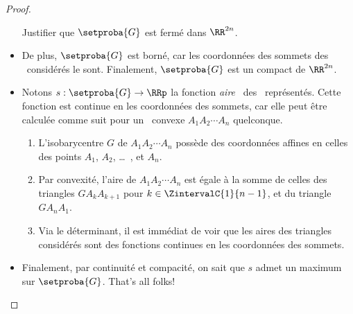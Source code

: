 \begin{proof}
\begin{itemize}
		Justifier que $\setproba{G}$ est fermé dans $\RR^{2n}$.






		\item De plus, $\setproba{G}$ est borné, car les coordonnées des sommets des \kgones\ considérés le sont.		
		Finalement, $\setproba{G}$ est un compact de $\RR^{2n}$.


		\item Notons $s: \setproba{G} \rightarrow \RRp$ la fonction \og \emph{aire} \fg\ des \ngones\ représentés. 
		Cette fonction est continue en les coordonnées des sommets, car elle peut être calculée comme suit pour un \ngone\ convexe $A_1 A_2 \cdots A_n$ quelconque.
		\begin{enumerate}
			\item L'isobarycentre $G$ de $A_1 A_2 \cdots A_n$ possède des coordonnées affines en celles des points $A_1$, $A_2$, \dots\ , et $A_n$.

			\item Par convexité, l'aire de $A_1 A_2 \cdots A_n$ est égale à la somme de celles des triangles $G A_k A_{k+1}$ pour $k \in \ZintervalC{1}{n-1}$, et du triangle $G A_n  A_1$.

			\item Via le déterminant, il est immédiat de voir que les aires des triangles considérés sont des fonctions continues en les coordonnées des sommets.
		\end{enumerate}
		
		
		\item Finalement, par continuité et compacité, on sait que $s$ admet un maximum sur $\setproba{G}$. That's all folks!
	\end{itemize}	
\end{proof}
